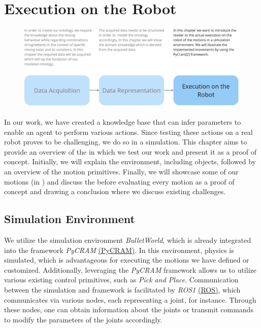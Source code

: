 \chapter{Execution on the Robot}
\begin{figure}[H]
    \includegraphics[scale=0.25]{Graphics/structure_overview3.jpg}
\end{figure}
In our work, we have created a knowledge base that can infer parameters to enable an agent to perform various actions.
Since testing these actions on a real robot proves to be challenging, we do so in a simulation.
This chapter aims to provide an overview of the  in which we test our work and present it as a proof of concept.
Initially, we will explain the environment, including objects, followed by an overview of the motion primitives.
Finally, we will showcase some of our motions (in ) and discuss the  before evaluating every motion as a proof of concept and drawing a conclusion where we discuss existing challenges.

\section{Simulation Environment}
\label{sec:simulation environment}

We utilize the simulation environment \textit{BulletWorld}, which is already integrated into the framework \textit{PyCRAM} \hyperref[sec:pycram]{(PyCRAM)}. In this environment, physics is simulated, which is advantageous for executing the motions we have defined or customized. Additionally, leveraging the \textit{PyCRAM} framework allows us to utilize various existing control primitives, such as \textit{Pick and Place}. Communication between the simulation and framework is facilitated by \textit{ROS1} \hyperref[sec:ROS]{(ROS)}, which communicates via various nodes, each representing a joint, for instance. Through these nodes, one can obtain information about the joints or transmit commands to modify the parameters of the joints accordingly.


